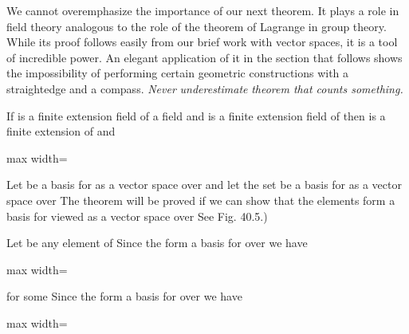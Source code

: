 \documentclass[11pt,oneside]{article}
\begin{document}
\begin{BookBody}
We cannot overemphasize the importance of our next theorem. It plays a role in field theory analogous to the role of the theorem of Lagrange in group theory. While its proof follows easily from our brief work with vector spaces, it is a tool of incredible power. An elegant application of it in the section that follows shows the impossibility of performing certain geometric constructions with a straightedge and a compass.\textit{ Never} \textit{underestimate}  \textit{theorem that counts something.}

 If  is a finite extension field of a field  and  is a finite extension field of  then  is a finite extension of  and

\begin{center}\begin{adjustbox}{max width=\linewidth}\end{adjustbox}\end{center}

 Let  be a basis for  as a vector space over  and let the set  be a basis for  as a vector space over  The theorem will be proved if we can show that the  elements  form a basis for  viewed as a vector space over See Fig. 40.5.)

Let \BookInline{\gamma } be any element of  Since the  form a basis for  over  we have

\begin{center}\begin{adjustbox}{max width=\linewidth}\end{adjustbox}\end{center}

\noindent for some  Since the  form a basis for  over  we have

\begin{center}\begin{adjustbox}{max width=\linewidth}\end{adjustbox}\end{center}


\end{BookBody}
\end{document}
